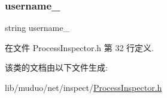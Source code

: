 \subsubsection{\texorpdfstring{username\+\_\+}{username\_}}
{\footnotesize\ttfamily string username\+\_\+\hspace{0.3cm}{\ttfamily [static]}}



在文件 Process\+Inspector.\+h 第 32 行定义.



该类的文档由以下文件生成\+:\begin{DoxyCompactItemize}
\item 
lib/muduo/net/inspect/\hyperlink{ProcessInspector_8h}{Process\+Inspector.\+h}\end{DoxyCompactItemize}

